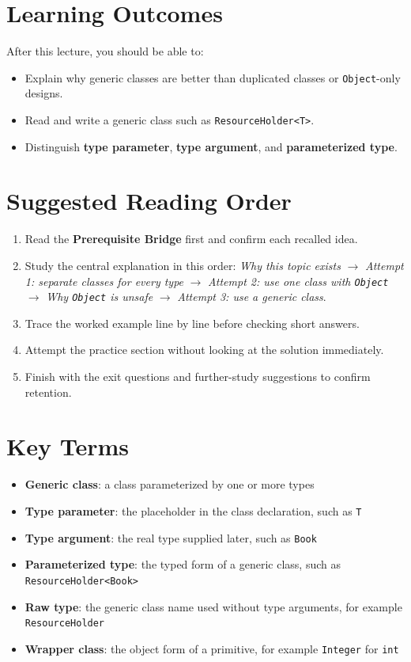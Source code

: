 \documentclass[11pt]{article}
\begin{document}
\section{Learning Outcomes}
After this lecture, you should be able to:
\begin{itemize}
  \item Explain why generic classes are better than duplicated classes or \texttt{Object}-only designs.
  \item Read and write a generic class such as \texttt{ResourceHolder<T>}.
  \item Distinguish \textbf{type parameter}, \textbf{type argument}, and \textbf{parameterized type}.
\end{itemize}

\section{Suggested Reading Order}
\begin{enumerate}
  \item Read the \textbf{Prerequisite Bridge} first and confirm each recalled idea.
  \item Study the central explanation in this order: \textit{Why this topic exists} $\rightarrow$ \textit{Attempt 1: separate classes for every type} $\rightarrow$ \textit{Attempt 2: use one class with \texttt{Object}} $\rightarrow$ \textit{Why \texttt{Object} is unsafe} $\rightarrow$ \textit{Attempt 3: use a generic class}.
  \item Trace the worked example line by line before checking short answers.
  \item Attempt the practice section without looking at the solution immediately.
  \item Finish with the exit questions and further-study suggestions to confirm retention.
\end{enumerate}
\notesources{\OOPSUnitIVSources}

\section{Key Terms}
\begin{itemize}
  \item \textbf{Generic class}: a class parameterized by one or more types
  \item \textbf{Type parameter}: the placeholder in the class declaration, such as \texttt{T}
  \item \textbf{Type argument}: the real type supplied later, such as \texttt{Book}
  \item \textbf{Parameterized type}: the typed form of a generic class, such as \texttt{ResourceHolder<Book>}
  \item \textbf{Raw type}: the generic class name used without type arguments, for example \texttt{ResourceHolder}
  \item \textbf{Wrapper class}: the object form of a primitive, for example \texttt{Integer} for \texttt{int}
\end{itemize}
\end{document}
